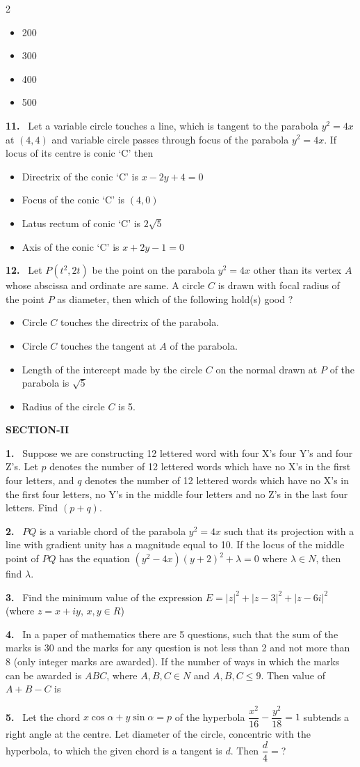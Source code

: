 \documentclass[10pt]{extarticle}
\newcommand{\sect}[1]{\par\smallskip\noindent\textbf{#1}\par}
\newcommand{\qn}[1]{\par\smallskip\noindent\textbf{#1.}~}
\newenvironment{qoptions}{\begin{itemize}[leftmargin=1.8em,itemsep=1pt,topsep=2pt,label={}]}{\end{itemize}}
\newcommand{\opt}[2]{\item[(#1)] #2}
\begin{document}
\begin{multicols}{2}
\begin{qoptions}
\opt{A}{200}
\opt{B}{300}
\opt{C}{400}
\opt{D}{500}
\end{qoptions}
\qn{11} Let a variable circle touches a line, which is tangent to the parabola $y^2=4x$ at $(4,4)$ and variable circle passes through focus of the parabola $y^2=4x$. If locus of its centre is conic `C' then
\begin{qoptions}
\opt{A}{Directrix of the conic `C' is $x-2y+4=0$}
\opt{B}{Focus of the conic `C' is $(4,0)$}
\opt{C}{Latus rectum of conic `C' is $2\sqrt5$}
\opt{D}{Axis of the conic `C' is $x+2y-1=0$}
\end{qoptions}
\qn{12} Let $P(t^2,2t)$ be the point on the parabola $y^2=4x$ other than its vertex $A$ whose abscissa and ordinate are same. A circle $C$ is drawn with focal radius of the point $P$ as diameter, then which of the following hold(s) good ?
\begin{qoptions}
\opt{A}{Circle $C$ touches the directrix of the parabola.}
\opt{B}{Circle $C$ touches the tangent at $A$ of the parabola.}
\opt{C}{Length of the intercept made by the circle $C$ on the normal drawn at $P$ of the parabola is $\sqrt5$}
\opt{D}{Radius of the circle $C$ is 5.}
\end{qoptions}
\sect{SECTION-II}
\qn{1} Suppose we are constructing 12 lettered word with four X's four Y's and four Z's. Let $p$ denotes the number of 12 lettered words which have no X's in the first four letters, and $q$ denotes the number of 12 lettered words which have no X's in the first four letters, no Y's in the middle four letters and no Z's in the last four letters. Find $(p+q)$.
\qn{2} $PQ$ is a variable chord of the parabola $y^2=4x$ such that its projection with a line with gradient unity has a magnitude equal to 10. If the locus of the middle point of $PQ$ has the equation $\left(y^2-4x\right)(y+2)^2+\lambda=0$ where $\lambda\in N$, then find $\lambda$.
\qn{3} Find the minimum value of the expression $E=|z|^2+|z-3|^2+|z-6i|^2$ (where $z=x+iy$, $x,y\in R$)
\qn{4} In a paper of mathematics there are 5 questions, such that the sum of the marks is 30 and the marks for any question is not less than 2 and not more than 8 (only integer marks are awarded). If the number of ways in which the marks can be awarded is $ABC$, where $A,B,C\in N$ and $A,B,C\le9$. Then value of $A+B-C$ is \underline{\hspace{1cm}}
\qn{5} Let the chord $x\cos\alpha+y\sin\alpha=p$ of the hyperbola $\dfrac{x^2}{16}-\dfrac{y^2}{18}=1$ subtends a right angle at the centre. Let diameter of the circle, concentric with the hyperbola, to which the given chord is a tangent is $d$. Then $\dfrac d4=$?

\end{multicols}
\end{document}
